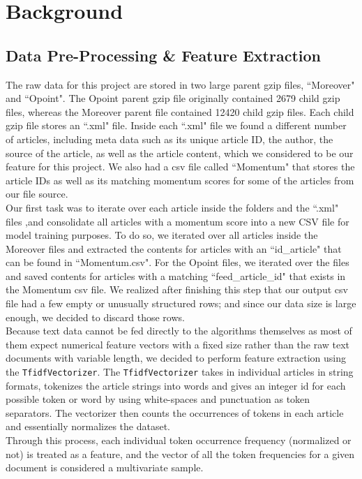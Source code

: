 
\section{Background}
\label{sec:background}

\subsection{Data Pre-Processing \& Feature Extraction}
The raw data for this project are stored in two large parent gzip files, ``Moreover" and ``Opoint". The Opoint parent  gzip file originally contained 2679 child gzip files, whereas the Moreover parent file contained 12420 child gzip files. Each child gzip file stores an ``.xml" file. Inside each ``.xml" file we found a  different number of articles, including meta data such as its unique article ID, the author, the source of the article, as well as the article content, which we considered to be our feature for this project. We also had a csv file called ``Momentum" that stores the article IDs as well as its matching momentum scores for some of the articles from our file source. \\

Our first task was to iterate over each article inside the folders and the ``.xml" files ,and consolidate all articles with a momentum score into a new CSV file for model training purposes. To do so, we iterated over all articles inside the Moreover files and extracted the contents for articles with an ``id\_article" that can be found in ``Momentum.csv". For the Opoint files, we iterated over the files and saved contents for articles with a matching ``feed\_article\_id" that exists in the Momentum csv file. We realized after finishing this step that our output csv file had a few empty or unusually structured rows; and since our data size is large enough, we decided to discard those rows. \\
Because text data cannot be fed directly to the algorithms themselves as most of them expect numerical feature vectors with a fixed size rather than the raw text documents with variable length, we decided to perform feature extraction using the \texttt{TfidfVectorizer}. The \texttt{TfidfVectorizer} takes in individual articles in string formats, tokenizes the article strings into words and gives an integer id for each possible token or word by using white-spaces and punctuation as token separators. The vectorizer then counts the occurrences of tokens in each article and essentially normalizes the dataset.\\
Through this process, each individual token occurrence frequency (normalized or not) is treated as a feature, and the vector of all the token frequencies for a given document is considered a multivariate sample.

